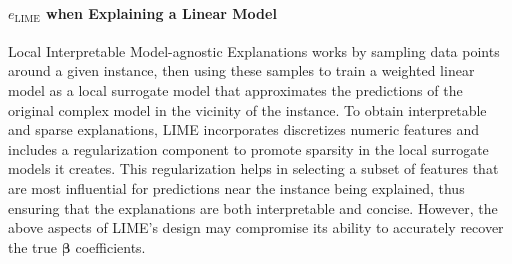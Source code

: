 \documentclass[mnsc,blindrev]{informs3}
\begin{document}
        \paragraph{$e_{\text{LIME}}$ when Explaining a Linear Model}
            \label{sec:lime_linear_case}
             Local Interpretable Model-agnostic Explanations works by sampling data points around a given instance, then using these samples to train a weighted linear model as a local surrogate model that approximates the predictions of the original complex model in the vicinity of the instance. To obtain interpretable and sparse explanations, LIME incorporates  discretizes numeric features and includes a regularization component to promote sparsity in the local surrogate models it creates. This regularization helps in selecting a subset of features that are most influential for predictions near the instance being explained, thus ensuring that the explanations are both interpretable and concise. However, the above aspects of LIME's design may compromise its ability to accurately recover the true $\boldsymbol{\beta}$ coefficients. 
\end{document}
